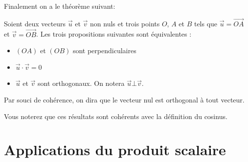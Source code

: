 \documentclass[french]{book}
\newcommand{\ve}[1]{\overrightarrow{#1}}
\begin{document}
Finalement on a le théorème suivant:


\begin{thm}
  Soient deux vecteurs $\ve{u}$ et $\ve{v}$ non nuls et trois points
$O$, $A$ et $B$ tels que $\ve{u}=\ve{OA}$ et $\ve{v}=\ve{OB}$. Les
trois propositions suivantes sont équivalentes :

\begin{itemize}
\item[$\bullet$] $(OA)$ et $(OB)$ sont perpendiculaires
\item[$\bullet$] $\ve{u}\cdot\ve{v}=0$
\item[$\bullet$] $\ve{u}$ et $\ve{v}$ sont orthogonaux. On notera $\ve{u}\bot\ve{v}$.
\end{itemize}

Par souci de cohérence, on dira que le vecteur nul est orthogonal
à tout vecteur.
\end{thm}


Vous noterez que ces résultats sont cohérents avec la définition
du cosinus.

\section{Applications du produit scalaire}
\end{document}
